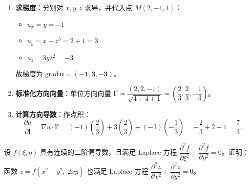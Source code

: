 \documentclass[lang=cn,11pt]{elegantbook}
\begin{document}
\begin{solution}
\begin{enumerate}
  \item \textbf{求梯度}：分别对 $x, y, z$ 求导，并代入点 $M(2,-1,1)$：
  \begin{itemize}
    \item $u_x = y = -1$
    \item $u_y = x+z^3 = 2+1=3$
    \item $u_z = 3yz^2 = -3$
  \end{itemize}
  故梯度为 $\mathbf{\mathrm{grad}\,u = (-1, 3, -3)}$。
  
  \item \textbf{标准化方向向量}：单位方向向量 $\boldsymbol l^\circ = \dfrac{(2,2,-1)}{\sqrt{4+4+1}} = \left(\dfrac{2}{3}, \dfrac{2}{3}, -\dfrac{1}{3}\right)$。
  
  \item \textbf{计算方向导数}：作点积：
  \[
  \frac{\partial u}{\partial \boldsymbol l} = \nabla u \cdot \boldsymbol l^\circ = (-1)\left(\frac{2}{3}\right) + 3\left(\frac{2}{3}\right) + (-3)\left(-\frac{1}{3}\right) = -\frac{2}{3} + 2 + 1 = \frac{7}{3}.
  \]
\end{enumerate}
\end{solution}



\begin{exercise}
设 $f(\xi,\eta)$ 具有连续的二阶偏导数，且满足 Laplace 方程 $\dfrac{\partial^2 f}{\partial\xi^2}+\dfrac{\partial^2 f}{\partial\eta^2}=0$。证明：函数 $z=f(x^2-y^2,\;2xy)$ 也满足 Laplace 方程 $\dfrac{\partial^2 z}{\partial x^2}+\dfrac{\partial^2 z}{\partial y^2}=0$。
\end{exercise}
\end{document}

